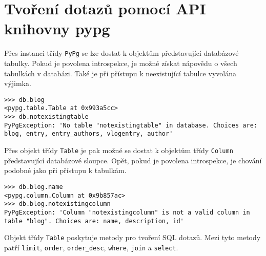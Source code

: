 \documentclass[11pt]{article}
\begin{document}
\section{Tvoření dotazů pomocí API knihovny pypg}

Přes instanci třídy \lstinline[style=inline]|PyPg| se lze dostat k objektům představující databázové tabulky. Pokud je povolena introspekce, je možné získat nápovědu o všech tabulkách v databázi. Také je při přístupu k neexistující tabulce vyvolána výjimka.

\begin{lstlisting}[style=python]
>>> db.blog
<pypg.table.Table at 0x993a5cc>
>>> db.notexistingtable
PyPgException: 'No table "notexistingtable" in database. Choices are: blog, entry, entry_authors, vlogentry, author'
\end{lstlisting}

Přes objekt třídy \lstinline[style=inline]|Table| je pak možné se dostat k objektům třídy \lstinline[style=inline]|Column| představující databázové sloupce. Opět, pokud je povolena introspekce, je chování podobné jako při přístupu k tabulkám.

\begin{lstlisting}[style=python]
>>> db.blog.name
<pypg.column.Column at 0x9b857ac>
>>> db.blog.notexistingcolumn
PyPgException: 'Column "notexistingcolumn" is not a valid column in table "blog". Choices are: name, description, id'
\end{lstlisting}

Objekt třídy \lstinline[style=inline]|Table| poskytuje metody pro tvoření SQL dotazů. Mezi tyto metody patří \lstinline[style=inline]|limit|, \lstinline[style=inline]|order|, \lstinline[style=inline]|order_desc|, \lstinline[style=inline]|where|, \lstinline[style=inline]|join| a \lstinline[style=inline]|select|.
\end{document}
